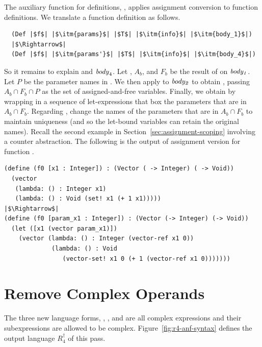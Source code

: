 \documentclass[11pt]{book}
\begin{document}
The auxiliary function for definitions, ,
applies assignment conversion to function definitions.
We translate a function definition as follows.
\begin{lstlisting}
  (Def |$f$| |$\itm{params}$| |$T$| |$\itm{info}$| |$\itm{body_1}$|)
  |$\Rightarrow$|
  (Def |$f$| |$\itm{params'}$| |$T$| |$\itm{info}$| |$\itm{body_4}$|)
\end{lstlisting}
So it remains to explain  and $\mathit{body}_4$.
Let , $A_b$, and $F_b$ be the result of
 on $\mathit{body_1}$.
Let $P$ be the parameter names in .
We then apply  to $\mathit{body_2}$ to
obtain , passing $A_b \cap F_b \cap P$
as the set of assigned-and-free variables.
Finally, we obtain  by wrapping 
in a sequence of let-expressions that box the parameters
that are in $A_b \cap F_b$.
%
Regarding , change the names of the parameters that are
in $A_b \cap F_b$ to maintain uniqueness (and so the let-bound
variables can retain the original names). Recall the second example in
Section~\ref{sec:assignment-scoping} involving a counter
abstraction. The following is the output of assignment version for
function .
\begin{lstlisting}
(define (f0 [x1 : Integer]) : (Vector ( -> Integer) ( -> Void))
  (vector
   (lambda: () : Integer x1)
   (lambda: () : Void (set! x1 (+ 1 x1)))))
|$\Rightarrow$|
(define (f0 [param_x1 : Integer]) : (Vector (-> Integer) (-> Void))
  (let ([x1 (vector param_x1)])
    (vector (lambda: () : Integer (vector-ref x1 0))
             (lambda: () : Void
                (vector-set! x1 0 (+ 1 (vector-ref x1 0)))))))
\end{lstlisting}


\section{Remove Complex Operands}
\label{sec:rco-loop}

The three new language forms, , , and
 are all complex expressions and their subexpressions are
allowed to be complex.  Figure~\ref{fig:r4-anf-syntax} defines the
output language $R_4^{\dagger}$ of this pass.
\end{document}
